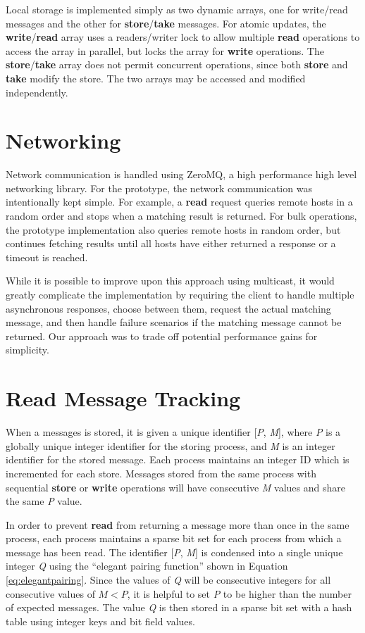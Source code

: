 Local storage is implemented simply as two dynamic arrays, one for write/read messages and the other for \textbf{store}/\textbf{take} messages. For atomic updates, the \textbf{write}/\textbf{read} array uses a readers/writer lock to allow multiple \textbf{read} operations to access the array in parallel, but locks the array for \textbf{write} operations. The \textbf{store}/\textbf{take} array does not permit concurrent operations, since both \textbf{store} and \textbf{take} modify the store. The two arrays may be accessed and modified independently.

\section{Networking}

Network communication is handled using ZeroMQ\cite{hintjens2013zeromq}, a high performance high level networking library. For the prototype, the network communication was intentionally kept simple. For example, a \textbf{read} request queries remote hosts in a random order and stops when a matching result is returned. For bulk operations, the prototype implementation also queries remote hosts in random order, but continues fetching results until all hosts have either returned a response or a timeout is reached.

While it is possible to improve upon this approach using multicast, it would greatly complicate the implementation by requiring the client to handle multiple asynchronous responses, choose between them, request the actual matching message, and then handle failure scenarios if the matching message cannot be returned. Our approach was to trade off potential performance gains for simplicity.

\section{Read Message Tracking}\label{sec:readmessages}

When a messages is stored, it is given a unique identifier [\textit{P}, \textit{M}], where \textit{P} is a globally unique integer identifier for the storing process, and \textit{M} is an integer identifier for the stored message. Each process maintains an integer ID which is incremented for each store. Messages stored from the same process with sequential \textbf{store} or \textbf{write} operations will have consecutive \textit{M} values and share the same \textit{P} value.

In order to prevent \textbf{read} from returning a message more than once in the same process, each process maintains a sparse bit set for each process from which a message has been read. The identifier [\textit{P}, \textit{M}] is condensed into a single unique integer \textit{Q} using the ``elegant pairing function''\cite{szudzikelegant} shown in Equation \ref{eq:elegantpairing}. Since the values of \textit{Q} will be consecutive integers for all consecutive values of $M < P$, it is helpful to set \textit{P} to be higher than the number of expected messages. The value \textit{Q} is then stored in a sparse bit set with a hash table using integer keys and bit field values.

